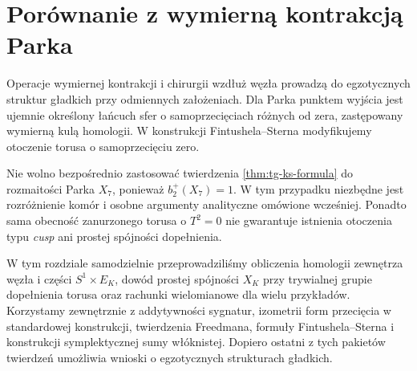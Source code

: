 \section{Porównanie z wymierną kontrakcją Parka}
\label{sec:tg-ks-compare}

Operacje wymiernej kontrakcji i chirurgii wzdłuż węzła
prowadzą do egzotycznych struktur gładkich przy
odmiennych założeniach. Dla Parka punktem wyjścia
jest ujemnie określony łańcuch sfer o samoprzecięciach
różnych od zera, zastępowany wymierną kulą homologii.
W konstrukcji Fintushela--Sterna modyfikujemy otoczenie
torusa o samoprzecięciu zero.

\begin{center}
\end{center}

Nie wolno bezpośrednio zastosować twierdzenia
\ref{thm:tg-ks-formula} do rozmaitości Parka $X_7$,
ponieważ $b_2^+(X_7)=1$. W tym przypadku
niezbędne jest rozróżnienie komór i osobne
argumenty analityczne omówione wcześniej.
Ponadto sama obecność zanurzonego torusa o
$T^2=0$ nie gwarantuje istnienia otoczenia typu
\emph{cusp} ani prostej spójności dopełnienia.

\begin{uwaga}
W tym rozdziale samodzielnie przeprowadziliśmy
obliczenia homologii zewnętrza węzła i części
$S^1\times E_K$, dowód prostej spójności
$X_K$ przy trywialnej grupie dopełnienia torusa
oraz rachunki wielomianowe dla wielu przykładów.
Korzystamy zewnętrznie z addytywności sygnatur,
izometrii form przecięcia w standardowej konstrukcji,
twierdzenia Freedmana, formuły Fintushela--Sterna
i konstrukcji symplektycznej sumy włóknistej.
Dopiero ostatni z tych pakietów twierdzeń
umożliwia wnioski o egzotycznych strukturach gładkich.
\end{uwaga}


